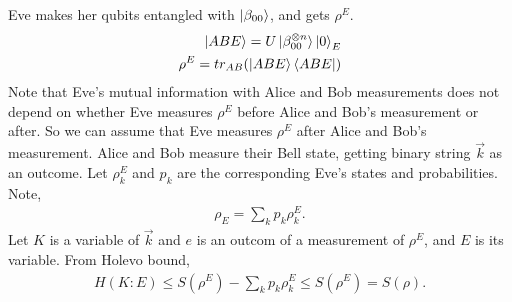 
Eve makes her qubits entangled with $\ket{\beta_{00}}$, and gets $\rho^E$.
\begin{align}
\ket{ABE} = U\ket{\beta_{00}^{\otimes n}}\ket{0}_E\\
\rho^E = tr_{AB} (\ket{ABE} \bra{ABE})
\end{align}
Note that Eve's mutual information with Alice and Bob measurements does not depend on whether Eve measures $\rho^E$ before Alice and Bob's measurement or after.
So we can assume that Eve measures $\rho^E$ after Alice and Bob's measurement.
Alice and Bob measure their Bell state, getting binary string $\vec{k}$ as an outcome.
Let $\rho^E_k$ and $p_k$ are the corresponding Eve's states and probabilities.
Note,
\begin{align}
\rho_E = \sum_k p_k \rho^E_k.
\end{align}
Let $K$ is a variable of $\vec{k}$ and $e$ is an outcom of a measurement of $\rho^E$, and $E$ is its variable.  From Holevo bound, 
\begin{align}
H(K:E) \le S(\rho^E) - \sum_k p_k \rho^E_k \le S(\rho^E) = S(\rho).
\end{align}

